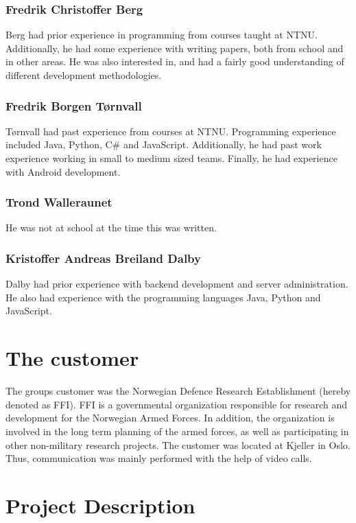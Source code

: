 \subsubsection{Fredrik Christoffer Berg}

Berg had prior experience in programming from courses taught at NTNU. Additionally, he had some experience with writing papers, both from school and in other areas. He was also interested in, and had a fairly good understanding of different development methodologies.

\subsubsection{Fredrik Borgen Tørnvall}
Tørnvall had past experience from courses at NTNU. Programming experience included Java, Python, C\# and JavaScript. Additionally, he had past work experience working in small to medium sized teams. Finally, he had experience with Android development. 

\subsubsection{Trond Walleraunet}

He was not at school at the time this was written.

\subsubsection{Kristoffer Andreas Breiland Dalby}
Dalby had prior experience with backend development and server administration. He also had experience with the programming languages Java, Python and JavaScript.

\section{The customer}
\label{sec:introduction-the_customer}

The groups customer was the Norwegian Defence Research Establishment (hereby denoted as FFI). FFI is a governmental organization responsible for research and development for the Norwegian Armed Forces. In addition, the organization is involved in the long term planning of the armed forces, as well as participating in other non-military research projects. The customer was located at Kjeller in Oslo. Thus, communication was mainly performed with the help of video calls.

\section{Project Description}
\label{sec:introduction-project_description}

